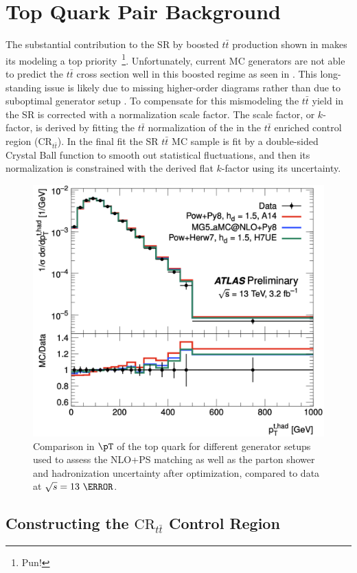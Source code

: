 \section{Top Quark Pair Background} \label{sec:background:ttbar}

The substantial contribution to the SR by boosted $t\bar{t}$ production shown
in  makes its modeling a top
priority~\footnote{Pun!}.  Unfortunately, current MC generators are not able to
predict the $t\bar{t}$ cross section well in this boosted regime as seen in
.  This long-standing issue is likely due to
missing higher-order diagrams rather than due to suboptimal generator setup
\cite{ATL-PHYS-PUB-2018-009}.  To compensate for this mismodeling the
$t\bar{t}$ yield in the SR is corrected with a normalization scale factor.  The
scale factor, or $k$-factor, is derived by fitting the $t\bar{t}$ normalization
of the in the $t\bar{t}$ enriched control region ($\text{CR}_{t\bar{t}}$).  In
the final fit the SR $t\bar{t}$ MC sample is fit by a double-sided Crystal Ball
function \cite{Gaiser:1982yw} to smooth out statistical fluctuations, and then
its normalization is constrained with the derived flat $k$-factor using its
uncertainty.

\begin{figure}[!htbp]
\centering
\includegraphics[width=0.6\linewidth]{figures/backgrounds/mismodeling}
\caption{Comparison in $\pT$ of the top quark for different generator setups
used to assess the NLO+PS matching as well as the parton shower and
hadronization uncertainty after optimization, compared to data at $\sqrt{s} =
13~\TeV$.}
\label{sec:background:mismodeling}
\end{figure}

\subsection{Constructing the $\text{CR}_{t\bar{t}}$ Control Region}

